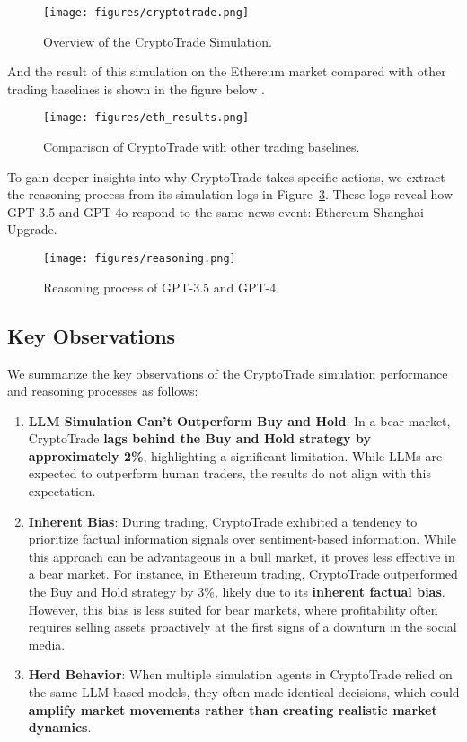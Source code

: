 \begin{figure}[htbp]
\centering
\texttt{[image: figures/cryptotrade.png]}
\caption{Overview of the CryptoTrade Simulation.}
\label{fig:cryptotrade}
\end{figure}

And the result of this simulation on the Ethereum market compared with other trading baselines is shown in the figure below \citep{li2024cryptotrade}.

\begin{figure}[htbp]
\centering
\texttt{[image: figures/eth\_results.png]}
\caption{Comparison of CryptoTrade with other trading baselines.}
\label{fig:eth_results}
\end{figure}

To gain deeper insights into why CryptoTrade takes specific actions, we extract the reasoning process from its simulation logs in Figure~\ref{fig:reasoning}. These logs reveal how GPT-3.5 and GPT-4o respond to the same news event: Ethereum Shanghai Upgrade.

\begin{figure}[htbp]
\centering
\texttt{[image: figures/reasoning.png]}
\caption{Reasoning process of GPT-3.5 and GPT-4.}
\label{fig:reasoning}
\end{figure}

\subsection{Key Observations}
We summarize the key observations of the CryptoTrade simulation performance and reasoning processes as follows:

\begin{enumerate}
\item \textbf{LLM Simulation Can't Outperform Buy and Hold}: In a bear market, CryptoTrade \textbf{lags behind the Buy and Hold strategy by approximately 2\%}, highlighting a significant limitation. While LLMs are expected to outperform human traders, the results do not align with this expectation.
\item \textbf{Inherent Bias}: During trading, CryptoTrade exhibited a tendency to prioritize factual information signals over sentiment-based information. While this approach can be advantageous in a bull market, it proves less effective in a bear market. For instance, in Ethereum trading, CryptoTrade outperformed the Buy and Hold strategy by 3\%, likely due to its \textbf{inherent factual bias}. However, this bias is less suited for bear markets, where profitability often requires selling assets proactively at the first signs of a downturn in the social media.
\item \textbf{Herd Behavior}: When multiple simulation agents in CryptoTrade relied on the same LLM-based models, they often made identical decisions, which could \textbf{amplify market movements rather than creating realistic market dynamics}.
\end{enumerate}

